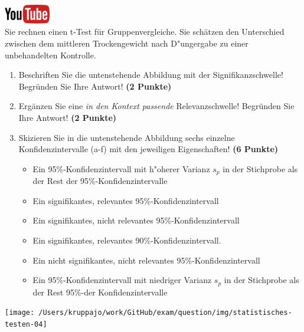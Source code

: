 \documentclass[a4paper, 10pt]{scrartcl}\usepackage[]{graphicx}\usepackage[]{xcolor}
\begin{document}
\hfill\href{https://youtu.be/CN_O4fYPbhs}{\includegraphics[width =
  2cm]{img/youtube}}\\[1Ex]



Sie rechnen einen t-Test f{\"u}r Gruppenvergleiche. Sie sch{\"a}tzen den Unterschied
zwischen dem mittleren Trockengewicht nach D{"u}ngergabe zu einer unbehandelten Kontrolle. 

\begin{enumerate}
\item Beschriften Sie die untenstehende Abbildung mit der
  Signifikanzschwelle! Begr{\"u}nden Sie Ihre Antwort! \textbf{(2 Punkte)}
\item Erg{\"a}nzen Sie eine \textit{in den Kontext passende} Relevanzschwelle!
  Begr{\"u}nden Sie Ihre Antwort! \textbf{(2 Punkte)} 
\item Skizieren Sie in die
  untenstehende Abbildung sechs einzelne Konfidenzintervalle (a-f) mit den
  jeweiligen Eigenschaften! \textbf{(6 Punkte)}
  \begin{itemize}
  \item[(a)] Ein 95\%-Konfidenzintervall mit h{"o}herer Varianz $s_p$ in der Stichprobe als der Rest der 95\%-Konfidenzintervalle 	
  \item[(b)] Ein signifikantes, relevantes 95\%-Konfidenzintervall 	
  \item[(c)] Ein signifikantes, nicht relevantes 95\%-Konfidenzintervall 	
  \item[(d)] Ein signifikantes, relevantes 90\%-Konfidenzintervall. 
  \item[(e)] Ein nicht signifikantes, nicht relevantes 95\%-Konfidenzintervall
  \item[(f)] Ein 95\%-Konfidenzintervall mit niedriger Varianz $s_p$ in der Stichprobe als der Rest 95\%-der Konfidenzintervalle
  \end{itemize}
\end{enumerate}

\begin{center}
  \texttt{[image: /Users/kruppajo/work/GitHub/exam/question/img/statistisches-testen-04]}
\end{center}
\end{document}
